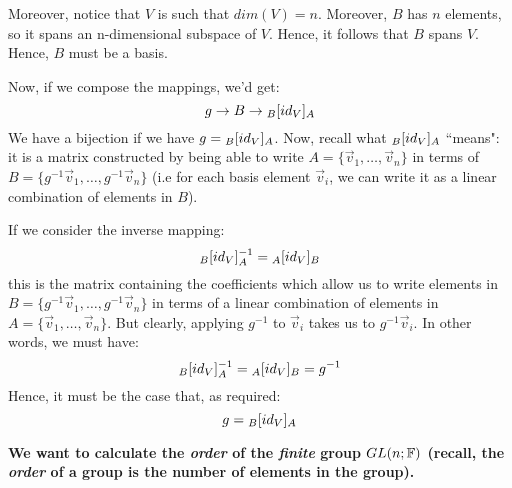 \documentclass{exam}
\begin{document}
\begin{questions}
\bigskip

Moreover, notice that $V$ is such that $dim(V) = n$. Moreover, $B$ has $n$ elements, so it spans an n-dimensional subspace of $V$. Hence, it follows that $B$ spans $V$. Hence, $B$ must be a basis.

\bigskip

Now, if we compose the mappings, we'd get:
\[
g \to B \to \cript{id_V}{B}{A}
\]
We have a bijection if we have $g = \cript{id_V}{B}{A}$. Now, recall what $\cript{id_V}{B}{A}$ ``means": it is a matrix constructed by being able to write $A = \{\vec{v}_1, \ldots, \vec{v}_n\}$ in terms of $B = \{g^{-1}\vec{v}_1, \ldots, g^{-1}\vec{v}_n\}$ (i.e for each basis element $\vec{v}_i$, we can write it as a linear combination of elements in $B$).

\bigskip

If we consider the inverse mapping:
\[
\cript{id_V}{B}{A}^{-1} = \cript{id_V}{A}{B}
\]
this is the matrix containing the coefficients which allow us to write elements in $B = \{g^{-1}\vec{v}_1, \ldots, g^{-1}\vec{v}_n\}$ in terms of a linear combination of elements in $A = \{\vec{v}_1, \ldots, \vec{v}_n\}$. But clearly, applying  $g^{-1}$ to $\vec{v}_i$ takes us to $g^{-1}\vec{v}_i$. In other words, we must have:
\[
\cript{id_V}{B}{A}^{-1} = \cript{id_V}{A}{B} = g^{-1}
\]
Hence, it must be the case that, as required:
\[
g = \cript{id_V}{B}{A}
\]

\question \textbf{We want to calculate the \textit{order} of the \textit{finite} group $GL(n; \F)$ (recall, the \textit{order} of a group is the number of elements in the group).}

\end{questions}
\end{document}
